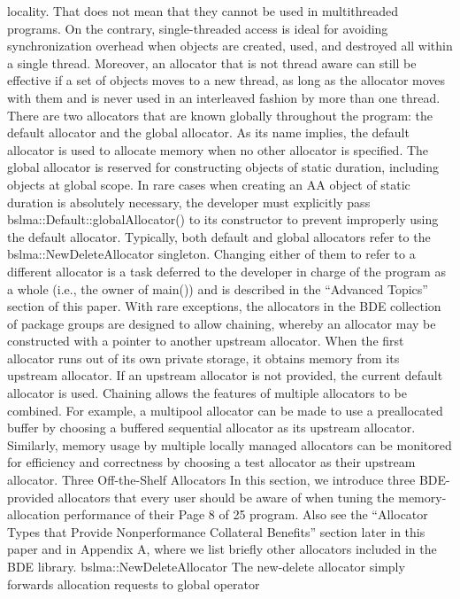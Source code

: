 locality. That does not mean that they cannot be used in multithreaded
programs. On the contrary, single-threaded access is ideal for avoiding
synchronization overhead when objects are created, used, and destroyed all
within a single thread. Moreover, an allocator that is not thread aware can still
be effective if a set of objects moves to a new thread, as long as the allocator
moves with them and is never used in an interleaved fashion by more than one
thread.
There are two allocators that are known globally throughout the program: the
default allocator and the global allocator. As its name implies, the default
allocator is used to allocate memory when no other allocator is specified. The
global allocator is reserved for constructing objects of static duration, including
objects at global scope. In rare cases when creating an AA object of static
duration is absolutely necessary, the developer must explicitly pass
bslma::Default::globalAllocator() to its constructor to prevent improperly
using the default allocator. Typically, both default and global allocators refer to
the bslma::NewDeleteAllocator singleton. Changing either of them to refer to a
different allocator is a task deferred to the developer in charge of the program
as a whole (i.e., the owner of main()) and is described in the “Advanced Topics”
section of this paper.
With rare exceptions, the allocators in the BDE collection of package groups
are designed to allow chaining, whereby an allocator may be constructed with a
pointer to another upstream allocator. When the first allocator runs out of its
own private storage, it obtains memory from its upstream allocator. If an
upstream allocator is not provided, the current default allocator is used.
Chaining allows the features of multiple allocators to be combined. For
example, a multipool allocator can be made to use a preallocated buffer by
choosing a buffered sequential allocator as its upstream allocator. Similarly,
memory usage by multiple locally managed allocators can be monitored for
efficiency and correctness by choosing a test allocator as their upstream
allocator.
Three Off-the-Shelf Allocators
In this section, we introduce three BDE-provided allocators that every user
should be aware of when tuning the memory-allocation performance of their 
Page 8 of 25
program. Also see the “Allocator Types that Provide Nonperformance Collateral
Benefits” section later in this paper and in Appendix A, where we list briefly
other allocators included in the BDE library.
bslma::NewDeleteAllocator
The new-delete allocator simply forwards allocation requests to global operator
